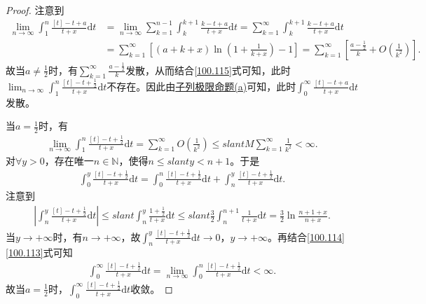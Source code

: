 \documentclass[../../main.tex]{subfiles}
\begin{document}
\begin{proof}
注意到
\begin{align}
\lim_{n\to\infty}\int_1^n\frac{[t] - t + a}{t + x}\mathrm{d}t &= \lim_{n\to\infty}\sum_{k=1}^{n-1}\int_k^{k+1}\frac{k - t + a}{t + x}\mathrm{d}t = \sum_{k=1}^{\infty}\int_k^{k+1}\frac{k - t + a}{t + x}\mathrm{d}t\nonumber\\
&= \sum_{k=1}^{\infty}\left[(a + k + x)\ln\left(1 + \frac{1}{k + x}\right) - 1\right] = \sum_{k=1}^{\infty}\left[\frac{a - \frac{1}{2}}{k} + O\left(\frac{1}{k^2}\right)\right].\label{100.115}
\end{align}
故当$a \ne \frac{1}{2}$时，有$\sum_{k=1}^{\infty}\frac{a - \frac{1}{2}}{k}$发散，从而结合\eqref{100.115}式可知，此时$\lim_{n\to\infty}\int_1^n\frac{[t] - t + \frac{1}{2}}{t + x}\mathrm{d}t$不存在。因此由\hyperref[proposition:子列极限命题]{子列极限命题(a)}可知，此时$\int_0^{\infty}\frac{[t] - t + a}{t + x}\mathrm{d}t$发散。

当$a = \frac{1}{2}$时，有
\begin{align}
\lim_{n\to\infty}\int_1^n\frac{[t] - t + \frac{1}{2}}{t + x}\mathrm{d}t = \sum_{k=1}^{\infty}O\left(\frac{1}{k^2}\right) \leqslant slant M\sum_{k=1}^{\infty}\frac{1}{k^2} < \infty.\label{100.114}
\end{align}
对$\forall y > 0$，存在唯一$n \in \mathbb{N}$，使得$n \leqslant slant y < n + 1$。于是
\begin{align}
\int_0^y\frac{[t] - t + \frac{1}{2}}{t + x}\mathrm{d}t = \int_0^n\frac{[t] - t + \frac{1}{2}}{t + x}\mathrm{d}t + \int_n^y\frac{[t] - t + \frac{1}{2}}{t + x}\mathrm{d}t.\label{100.113}
\end{align}
注意到
\begin{align*}
\left|\int_n^y\frac{[t] - t + \frac{1}{2}}{t + x}\mathrm{d}t\right| \leqslant slant \int_n^y\frac{1 + \frac{1}{2}}{t + x}\mathrm{d}t \leqslant slant \frac{3}{2}\int_n^{n+1}\frac{1}{t + x}\mathrm{d}t = \frac{3}{2}\ln\frac{n + 1 + x}{n + x}.
\end{align*}
当$y \to +\infty$时，有$n \to +\infty$，故$\int_n^y\frac{[t] - t + \frac{1}{2}}{t + x}\mathrm{d}t \to 0$，$y \to +\infty$。再结合\eqref{100.114}\eqref{100.113}式可知
\begin{align*}
\int_0^{\infty}\frac{[t] - t + \frac{1}{2}}{t + x}\mathrm{d}t = \lim_{n\to\infty}\int_0^n\frac{[t] - t + \frac{1}{2}}{t + x}\mathrm{d}t < \infty.
\end{align*}
故当$a = \frac{1}{2}$时，$\int_0^{\infty}\frac{[t] - t + \frac{1}{2}}{t + x}\mathrm{d}t$收敛。
\end{proof}
\end{document}
